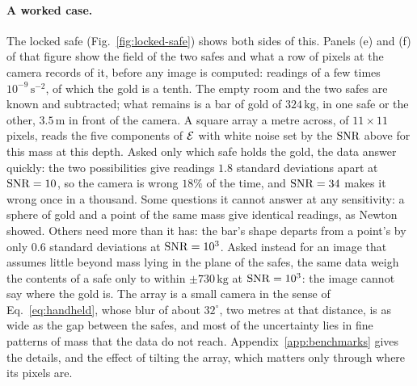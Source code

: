 \paragraph{A worked case.} The locked safe (Fig.~\ref{fig:locked-safe}) shows
both sides of this. Panels (e) and (f) of that figure show the field of the two
safes and what a row of pixels at the camera records of it, before any
image is computed: readings of a few times $10^{-9}\,\mathrm{s^{-2}}$, of which
the gold is a tenth. The empty room and the two safes are known and subtracted;
what remains is a bar of gold of $324\,\mathrm{kg}$, in one safe or the other,
$3.5\,\mathrm{m}$ in front of the camera. A square array a metre across, of
$11\times11$ pixels, reads the five components of $\mathcal{E}$ with white noise set by
the $\mathrm{SNR}$ above for this mass at this depth. Asked only which safe holds the
gold, the data answer quickly: the two possibilities give readings $1.8$
standard deviations apart at $\mathrm{SNR} = 10$, so the camera is wrong $18\%$ of the
time, and $\mathrm{SNR} = 34$ makes it wrong once in a thousand. Some questions it
cannot answer at any sensitivity: a sphere of gold and a point of the same mass
give identical readings, as Newton showed. Others need more than it has: the
bar's shape departs from a point's by only $0.6$ standard deviations at
$\mathrm{SNR} = 10^3$. Asked instead for an image that assumes little beyond mass lying
in the plane of the safes, the
same data weigh the contents of a safe only to within $\pm 730\,\mathrm{kg}$ at
$\mathrm{SNR} = 10^3$: the image cannot say where the gold is. The array is a small
camera in the sense of Eq.~\eqref{eq:handheld}, whose blur of about $32^\circ$,
two metres at that distance, is as wide as the gap between the safes, and most of the uncertainty lies in
fine patterns of mass that the data do not reach. Appendix~\ref{app:benchmarks} gives the details, and
the effect of tilting the array, which matters only through where its pixels
are.

